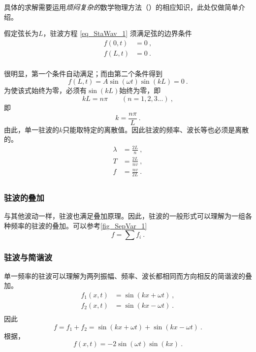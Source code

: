 具体的求解需要运用\textsl{烦闷复杂的}数学物理方法（）的相应知识，此处仅做简单介绍。

假定弦长为$L$，驻波方程 \autoref{eq_StaWav_1} 须满足弦的边界条件 
$$
\begin{aligned}
f(0,t)&=0~,\\
f(L,t)&=0~.\\
\end{aligned}
$$

很明显，第一个条件自动满足；而由第二个条件得到
$$
f(L,t)=A\sin(\omega t)\sin(kL)=0~.
$$
为使该式始终为零，必须有$\sin(kL)$始终为零，即
$$kL = n\pi \qquad (n=1,2,3...)~,$$
即
\begin{equation}
k=\frac{n\pi}{L}~.
\end{equation}
由此，单一驻波的$k$只能取特定的离散值。因此驻波的频率、波长等也必须是离散的。
\begin{equation}
\begin{aligned}
\lambda &=\frac{2L}{n}~,\\
T &=\frac{2L}{nv}~,\\
f &=\frac{nv}{2L}~.\\
\end{aligned}
\end{equation}
\subsubsection{驻波的叠加}
与其他波动一样，驻波也满足叠加原理。因此，驻波的一般形式可以理解为一组各种频率的驻波的叠加。可以参考\autoref{fig_SepVar_1}~
$$f=\sum f_i~.$$

\subsubsection{驻波与简谐波}
单一频率的驻波可以理解为两列振幅、频率、波长都相同而方向相反的简谐波的叠加。
$$
\begin{aligned}
f_1(x,t)&=\sin(kx+\omega t)~,\\
f_2(x,t)&=\sin(kx-\omega t)~.\\
\end{aligned}
$$
因此
$$f=f_1+f_2=\sin(kx+\omega t)+\sin(kx-\omega t)~.$$
根据，
\begin{equation}
f(x,t)=-2\sin(\omega t)\sin(kx)~.
\end{equation}

